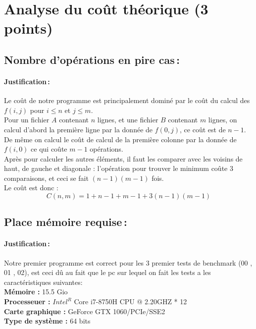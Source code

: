 \documentclass[a4paper,10pt,french]{article}
\begin{document}
\section{Analyse du coût théorique (3 points)}
  \subsection{Nombre  d'opérations en pire cas\,: }
    \paragraph{Justification\,: }
    Le coût de notre programme est principalement dominé par le coût du calcul des $f(i, j)$ pour $i \leq n$ et $j \leq m$.\\
    
    Pour un fichier $A$ contenant $n$ lignes, et une fichier $B$ contenant $m$ lignes, on calcul d'abord la première ligne par la donnée de $f(0, j)$, ce coût est de $n - 1$. De même on calcul le coût de calcul de la première colonne par la donnée de $f(i, 0)$ ce qui coûte $m - 1$ opérations.\\
    
    Après pour calculer les autres éléments, il faut les comparer avec les voisins de haut, de gauche et diagonale : l'opération pour trouver le minimum coûte $3$ comparaisons, et ceci se fait $(n - 1)(m - 1)$ fois.\\
    
    Le coût est donc :
    $$C(n, m) = 1 + n - 1 + m - 1 + 3(n - 1)(m - 1)$$
    
  \subsection{Place mémoire requise\,: }
  \paragraph{Justification\,: }
  Notre premier programme est correct pour les 3 premier tests de benchmark (00 , 01 , 02), est ceci dû au fait que le
  pc sur lequel on fait les tests a les caractéristiques suivantes:\\
  
  
  {\bf Mémoire :} 15.5 Gio \\
  {\bf Processeuer :} $Intel^R$ Core i7-8750H CPU @ 2.20GHZ * 12 \\
  {\bf Carte graphique :} GeForce GTX 1060/PCIe/SSE2 \\
  {\bf Type de système :} 64 bits \\
  
\end{document}
